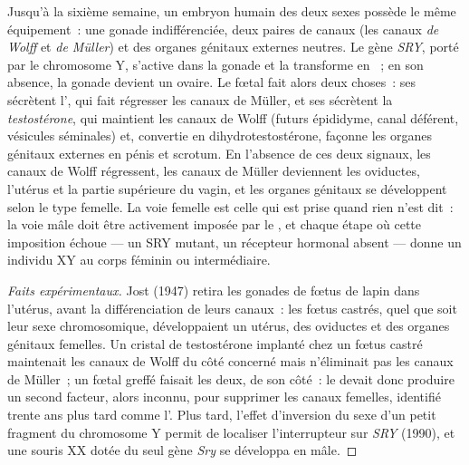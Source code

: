 \begin{proposition}\label{prop:b2:mammal-reproduction:sex}
Jusqu'à la sixième semaine, un embryon humain des deux sexes possède le
même équipement~: une gonade indifférenciée, deux paires de canaux (les
canaux \emph{de Wolff} et \emph{de Müller}) et des organes génitaux
externes neutres. Le gène \emph{SRY}, porté par le chromosome Y,
s'active dans la gonade et la transforme en ~; en son absence,
la gonade devient un ovaire. Le  fœtal fait alors deux choses~:
ses  sécrètent l'\emph{}, qui
fait régresser les canaux de Müller, et ses  sécrètent
la \emph{testostérone}, qui maintient les canaux de Wolff (futurs
épididyme, canal déférent, vésicules séminales) et, convertie en
dihydrotestostérone, façonne les organes génitaux externes en pénis et
scrotum. En l'absence de ces deux signaux, les canaux de Wolff
régressent, les canaux de Müller deviennent les oviductes, l'utérus et
la partie supérieure du vagin, et les organes génitaux se développent
selon le type femelle. La voie femelle est celle qui est prise quand
rien n'est dit~: la voie mâle doit être activement imposée par le
, et chaque étape où cette imposition échoue --- un SRY
mutant, un récepteur hormonal absent --- donne un individu XY au corps
féminin ou intermédiaire.
\end{proposition}
\begin{proof}[Faits expérimentaux]
Jost (1947) retira les gonades de fœtus de lapin dans l'utérus, avant
la différenciation de leurs canaux~: les fœtus castrés, quel que soit
leur sexe chromosomique, développaient un utérus, des oviductes et des
organes génitaux femelles. Un cristal de testostérone implanté chez un
fœtus castré maintenait les canaux de Wolff du côté concerné mais
n'éliminait pas les canaux de Müller~; un  fœtal greffé faisait
les deux, de son côté~: le  devait donc produire un second
facteur, alors inconnu, pour supprimer les canaux femelles, identifié
trente ans plus tard comme l'. Plus tard, l'effet
d'inversion du sexe d'un petit fragment du chromosome Y permit de
localiser l'interrupteur sur \emph{SRY} (1990), et une souris XX dotée
du seul gène \emph{Sry} se développa en mâle.
\end{proof}

